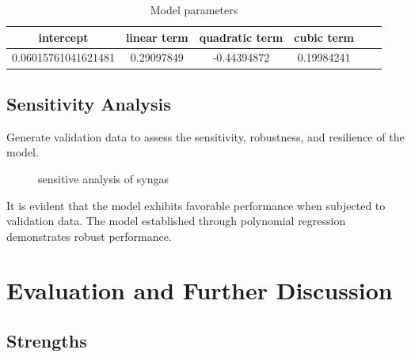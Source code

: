 \documentclass{swmcmthesis}
\begin{document}
\begin{table}[h!t]
    \centering
    \caption{Model parameters}
    \label{tbl:label}
    \begin{tabular}{cccccc}
    \toprule
    intercept & linear term & quadratic term & cubic term \\
    \midrule
    0.06015761041621481 & 0.29097849 & -0.44394872 & 0.19984241 \\

    \bottomrule
    \end{tabular}
\end{table}

\subsection{Sensitivity Analysis}

Generate validation data to assess the sensitivity, robustness, and resilience of the model.

\begin{figure}[h!t]
    \centering
    \hfill
    \caption{sensitive analysis of syngas}
\end{figure}

It is evident that the model exhibits favorable performance when subjected to validation data. The model established through polynomial regression demonstrates robust performance.

\section{Evaluation and Further Discussion}

\subsection{Strengths}
\end{document}

